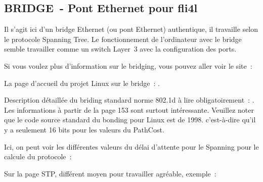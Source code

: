 {
\subsection {BRIDGE~- Pont Ethernet pour fli4l}
}

Il s'agit ici d'un bridge Ethernet (ou pont Ethernet) authentique, il travaille selon
le protocole Spanning Tree. Le fonctionnement de l'ordinateur avec le bridge semble
travailler comme un switch Layer~3 avec la configuration des ports.

Si vous voulez plus d'information sur le bridging, vous pouvez aller voir le site~:

La page d'accueil du projet Linux sur le bridge~:
.

Description détaillée du briding standard norme 802.1d à lire obligatoirement~:
. Les informations
à partir de la page 153 sont surtout intéressante. Veuillez noter que le code source
standard du bonding pour Linux est de 1998. c'est-à-dire qu'il y a seulement 16 bits
pour les valeurs du PathCost.

Ici, on peut voir les différentes valeurs du délai d'attente pour le Spanning
pour le calcule du protocole~:

Sur la page STP, différent moyen pour travailler agréable, exemple~:

